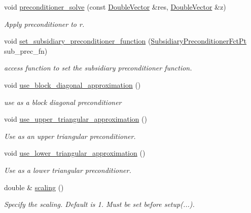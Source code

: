 \begin{DoxyCompactItemize}
void \hyperlink{classoomph_1_1PseudoElasticPreconditionerSubsidiaryBlockPreconditionerOld_a31f3b927696c11c90f704178cae13e7e}{preconditioner\+\_\+solve} (const \hyperlink{classoomph_1_1DoubleVector}{Double\+Vector} \&res, \hyperlink{classoomph_1_1DoubleVector}{Double\+Vector} \&z)
\begin{DoxyCompactList}\small\item\em Apply preconditioner to r. \end{DoxyCompactList}\item 
void \hyperlink{classoomph_1_1PseudoElasticPreconditionerSubsidiaryBlockPreconditionerOld_a6c238d4e402413fe20061d5735acb40c}{set\+\_\+subsidiary\+\_\+preconditioner\+\_\+function} (\hyperlink{classoomph_1_1PseudoElasticPreconditionerSubsidiaryBlockPreconditionerOld_a85f57923e70244d5fde0538946eb8c3d}{Subsidiary\+Preconditioner\+Fct\+Pt} sub\+\_\+prec\+\_\+fn)
\begin{DoxyCompactList}\small\item\em access function to set the subsidiary preconditioner function. \end{DoxyCompactList}\item 
void \hyperlink{classoomph_1_1PseudoElasticPreconditionerSubsidiaryBlockPreconditionerOld_a1d2c4fa73f0e4839e20ddca2e799da3c}{use\+\_\+block\+\_\+diagonal\+\_\+approximation} ()
\begin{DoxyCompactList}\small\item\em use as a block diagonal preconditioner \end{DoxyCompactList}\item 
void \hyperlink{classoomph_1_1PseudoElasticPreconditionerSubsidiaryBlockPreconditionerOld_a3a6487cc895a4e3a3fe8f978024e116e}{use\+\_\+upper\+\_\+triangular\+\_\+approximation} ()
\begin{DoxyCompactList}\small\item\em Use as an upper triangular preconditioner. \end{DoxyCompactList}\item 
void \hyperlink{classoomph_1_1PseudoElasticPreconditionerSubsidiaryBlockPreconditionerOld_a4ac42f45ed94d02f2fd25b3807653979}{use\+\_\+lower\+\_\+triangular\+\_\+approximation} ()
\begin{DoxyCompactList}\small\item\em Use as a lower triangular preconditioner. \end{DoxyCompactList}\item 
double \& \hyperlink{classoomph_1_1PseudoElasticPreconditionerSubsidiaryBlockPreconditionerOld_ad6cb2301227704660e2f621f9de504cf}{scaling} ()
\begin{DoxyCompactList}\small\item\em Specify the scaling. Default is 1. Must be set before setup(...). \end{DoxyCompactList}\end{DoxyCompactItemize}
